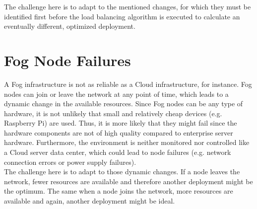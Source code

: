The challenge here is to adapt to the mentioned changes, for which they must be identified first before the load balancing algorithm is executed to calculate an eventually different, optimized deployment.

\section{Fog Node Failures}
A Fog infrastructure is not as reliable as a Cloud infrastructure, for instance. Fog nodes can join or leave the network at any point of time, which leads to a dynamic change in the available resources. Since Fog nodes can be any type of hardware, it is not unlikely that small and relatively cheap devices (e.g. Raspberry Pi) are used. Thus, it is more likely that they might fail since the hardware components are not of high quality compared to enterprise server hardware. Furthermore, the environment is neither monitored nor controlled like a Cloud server data center, which could lead to node failures (e.g. network connection errors or power supply failures).\\

The challenge here is to adapt to those dynamic changes. If a node leaves the network, fewer resources are available and therefore another deployment might be the optimum. The same when a node joins the network, more resources are available and again, another deployment might be ideal.
